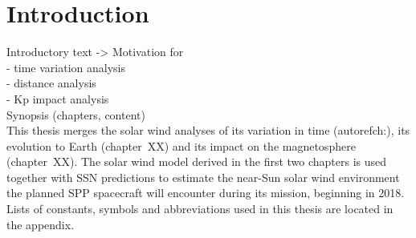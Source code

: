 \chapter{Introduction}
\label{chap:introduction}

Introductory text -> Motivation for\\
- time variation analysis\\
- distance analysis\\
- Kp impact analysis\\



Synopsis (chapters, content)\\	%
This thesis merges the solar wind analyses of its variation in time (autoref{ch:}), its evolution to Earth (chapter~XX) and its impact on the magnetosphere (chapter~XX). The solar wind model derived in the first two chapters is used together with SSN predictions to estimate the near-Sun solar wind environment the planned SPP spacecraft will encounter during its mission, beginning in 2018. Lists of constants, symbols and abbreviations used in this thesis are located in the appendix.\\



